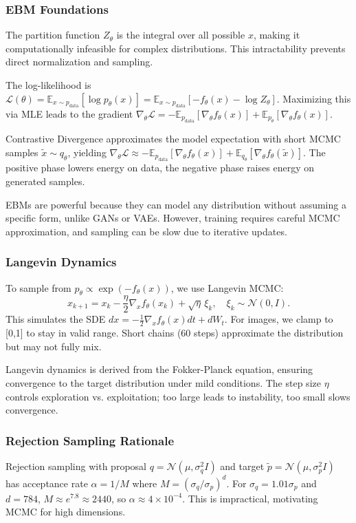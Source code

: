 \documentclass[a4paper,12pt]{article}
\begin{document}
\subsubsection{EBM Foundations}
The partition function $Z_\theta$ is the integral over all possible $x$, making it computationally infeasible for complex distributions. This intractability prevents direct normalization and sampling.

The log-likelihood is $\mathcal{L}(\theta) = \mathbb{E}_{x \sim p_{\text{data}}} [\log p_\theta(x)] = \mathbb{E}_{x \sim p_{\text{data}}} [-f_\theta(x) - \log Z_\theta]$. Maximizing this via MLE leads to the gradient $\nabla_\theta \mathcal{L} = -\mathbb{E}_{p_{\text{data}}} [\nabla_\theta f_\theta(x)] + \mathbb{E}_{p_\theta} [\nabla_\theta f_\theta(x)]$.

Contrastive Divergence approximates the model expectation with short MCMC samples $\tilde{x} \sim q_\theta$, yielding $\nabla_\theta \mathcal{L} \approx -\mathbb{E}_{p_{\text{data}}} [\nabla_\theta f_\theta(x)] + \mathbb{E}_{q_\theta} [\nabla_\theta f_\theta(\tilde{x})]$. The positive phase lowers energy on data, the negative phase raises energy on generated samples.

EBMs are powerful because they can model any distribution without assuming a specific form, unlike GANs or VAEs. However, training requires careful MCMC approximation, and sampling can be slow due to iterative updates.

\subsubsection{Langevin Dynamics}
To sample from $p_\theta \propto \exp(-f_\theta(x))$, we use Langevin MCMC:
\begin{equation}
    x_{k+1} = x_k - \frac{\eta}{2} \nabla_x f_\theta(x_k) + \sqrt{\eta} \, \xi_k, \quad \xi_k \sim \mathcal{N}(0, I).
\end{equation}
This simulates the SDE $dx = -\frac{1}{2} \nabla_x f_\theta(x) dt + dW_t$. For images, we clamp to [0,1] to stay in valid range. Short chains (60 steps) approximate the distribution but may not fully mix.

Langevin dynamics is derived from the Fokker-Planck equation, ensuring convergence to the target distribution under mild conditions. The step size $\eta$ controls exploration vs. exploitation; too large leads to instability, too small slows convergence.

\subsubsection{Rejection Sampling Rationale}
Rejection sampling with proposal $q = \mathcal{N}(\mu, \sigma_q^2 I)$ and target $\tilde{p} = \mathcal{N}(\mu, \sigma_p^2 I)$ has acceptance rate $\alpha = 1/M$ where $M = (\sigma_q / \sigma_p)^d$. For $\sigma_q = 1.01 \sigma_p$ and $d=784$, $M \approx e^{7.8} \approx 2440$, so $\alpha \approx 4 \times 10^{-4}$. This is impractical, motivating MCMC for high dimensions.
\end{document}
